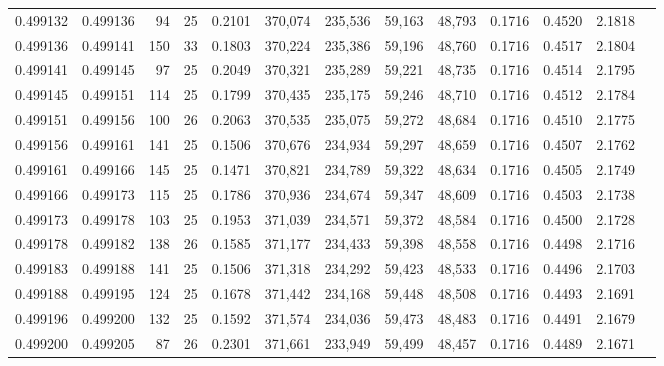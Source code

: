 \begin{tabular}{rrrrrrrrrrrrr}
0.499132 & 0.499136 &  94 &  25 &                                     0.2101 & 370,074 & 235,536 &  59,163 &  48,793 & 0.1716 & 0.4520 & 2.1818 \\
0.499136 & 0.499141 & 150 &  33 &                                     0.1803 & 370,224 & 235,386 &  59,196 &  48,760 & 0.1716 & 0.4517 & 2.1804 \\
0.499141 & 0.499145 &  97 &  25 &                                     0.2049 & 370,321 & 235,289 &  59,221 &  48,735 & 0.1716 & 0.4514 & 2.1795 \\
0.499145 & 0.499151 & 114 &  25 &                                     0.1799 & 370,435 & 235,175 &  59,246 &  48,710 & 0.1716 & 0.4512 & 2.1784 \\
0.499151 & 0.499156 & 100 &  26 &                                     0.2063 & 370,535 & 235,075 &  59,272 &  48,684 & 0.1716 & 0.4510 & 2.1775 \\
0.499156 & 0.499161 & 141 &  25 &                                     0.1506 & 370,676 & 234,934 &  59,297 &  48,659 & 0.1716 & 0.4507 & 2.1762 \\
0.499161 & 0.499166 & 145 &  25 &                                     0.1471 & 370,821 & 234,789 &  59,322 &  48,634 & 0.1716 & 0.4505 & 2.1749 \\
0.499166 & 0.499173 & 115 &  25 &                                     0.1786 & 370,936 & 234,674 &  59,347 &  48,609 & 0.1716 & 0.4503 & 2.1738 \\
0.499173 & 0.499178 & 103 &  25 &                                     0.1953 & 371,039 & 234,571 &  59,372 &  48,584 & 0.1716 & 0.4500 & 2.1728 \\
0.499178 & 0.499182 & 138 &  26 &                                     0.1585 & 371,177 & 234,433 &  59,398 &  48,558 & 0.1716 & 0.4498 & 2.1716 \\
0.499183 & 0.499188 & 141 &  25 &                                     0.1506 & 371,318 & 234,292 &  59,423 &  48,533 & 0.1716 & 0.4496 & 2.1703 \\
0.499188 & 0.499195 & 124 &  25 &                                     0.1678 & 371,442 & 234,168 &  59,448 &  48,508 & 0.1716 & 0.4493 & 2.1691 \\
0.499196 & 0.499200 & 132 &  25 &                                     0.1592 & 371,574 & 234,036 &  59,473 &  48,483 & 0.1716 & 0.4491 & 2.1679 \\
0.499200 & 0.499205 &  87 &  26 &                                     0.2301 & 371,661 & 233,949 &  59,499 &  48,457 & 0.1716 & 0.4489 & 2.1671 \\

\end{tabular}
